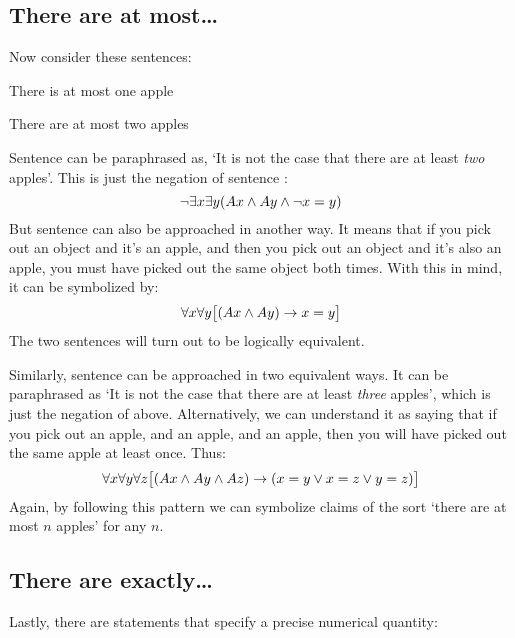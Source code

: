\subsection{There are at most\ldots}
Now consider these sentences:
\begin{earg}
	\item[\ex{atmost1}] There is at most one apple
	\item[\ex{atmost2}] There are at most two apples
\end{earg}
Sentence  can be paraphrased as, `It is not the case that there are at least \emph{two} apples'. This is just the negation of sentence :
$$\neg \exists x \exists y(Ax \wedge Ay \wedge \neg x = y)$$
But sentence  can also be approached in another way. It means that if you pick out an object and it's an apple, and then you pick out an object and it's also an apple, you must have picked out the same object both times. With this in mind, it can be symbolized by:
$$\forall x\forall y\bigl[(Ax \wedge Ay) \rightarrow x=y\bigr]$$
The two sentences will turn out to be logically equivalent.

Similarly, sentence  can be approached in two equivalent ways. It can be paraphrased as `It is not the case that there are at least \emph{three} apples', which is just the negation of  above.  Alternatively, we can understand it as saying that if you pick out an apple, and an apple, and an apple, then you will have picked out the same apple at least once. Thus:
$$\forall x\forall y\forall z\bigl[(Ax \wedge Ay \wedge Az) \rightarrow (x=y \vee x=z \vee y=z)\bigr]$$
Again, by following this pattern we can symbolize claims of the sort `there are at most $n$ apples' for any $n$.
\subsection{There are exactly\ldots}
Lastly, there are statements that specify a precise numerical quantity:

